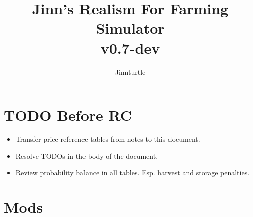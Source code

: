 \documentclass[a4paper,10pt]{article}
\begin{document}
\newlength{\tabcolsepDefault}
\setlength{\tabcolsepDefault}{\tabcolsep}




\newcommand{\textbi}[1]{\textbf{\textit{#1}}}

\newcommand{\projName}{Jinn's Realism For Farming Simulator}
\newcommand{\projVersion}{v0.7-dev}

\newcommand{\refPageref}[1]{\ref{#1} (p. \pageref{#1})}


\title{\projName{}\\ \projVersion{}}
\author{Jinnturtle}

\maketitle
\tableofcontents


\section{TODO Before RC}
\begin{itemize}
\item Transfer price reference tables from notes to this document.
\item Resolve TODOs in the body of the document.
\item Review probability balance in all tables. Esp. harvest and storage
  penalties.
\end{itemize}


\section{Mods}
\end{document}

